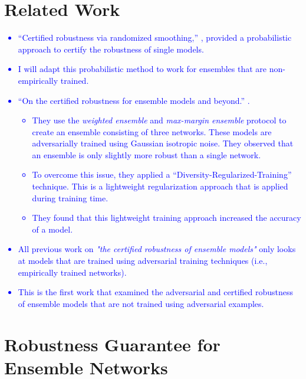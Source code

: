 \documentclass{article}
\begin{document}
\section{Related Work}
\textcolor{blue}{
\begin{itemize}
    \item “Certified robustness via randomized smoothing,” \cite{reference4}, provided a probabilistic approach to certify the robustness of single models. 
    \item I will adapt this probabilistic method to work for ensembles that are non-empirically trained. 
    \item “On the certified robustness for ensemble models and beyond.” \cite{reference6}.
    \begin{itemize}
        \item They use the \textit{weighted ensemble} and \textit{max-margin ensemble} protocol to create an ensemble consisting of three networks. These models are adversarially trained using Gaussian isotropic noise. They observed that an ensemble is only slightly more robust than a single network.
    \end{itemize}
    \begin{itemize}
        \item To overcome this issue, they applied a “Diversity-Regularized-Training” \cite{reference6} technique. This is a lightweight regularization approach that is applied during training time.
        \item They found that this lightweight training approach increased the accuracy of a model. 
    \end{itemize}
    \item All previous work on \textit{"the certified robustness of ensemble models"} only looks at models that are trained using adversarial training techniques (i.e., empirically trained networks).
    \item This is the first work that examined the adversarial and certified robustness of ensemble models that are not trained using adversarial examples.
\end{itemize}
}
\section{Robustness Guarantee for Ensemble Networks}
\end{document}
